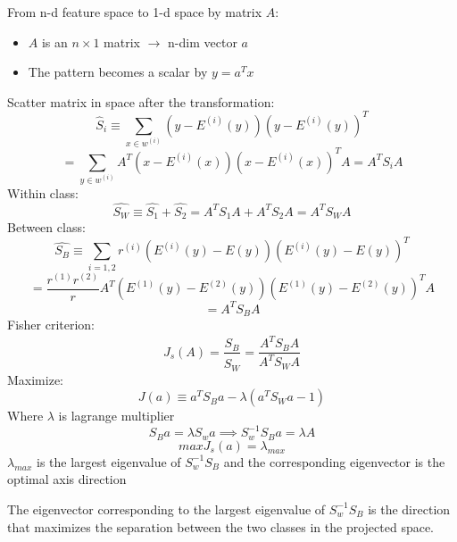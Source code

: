 \documentclass[12pt,a4paper]{article}
\begin{document}
From n-d feature space to 1-d space by matrix $A$:
\begin{itemize}
    \item $A$ is an $n \times 1$ matrix $\rightarrow$ n-dim vector $a$
    \item The pattern becomes a scalar by $y = a^T x$
\end{itemize}

Scatter matrix in space after the transformation:
\[
\hat{S}_i \equiv \sum_{x \in w^{(i)}} (y - E^{(i)}(y))(y - E^{(i)}(y))^T
\]
\[
= \sum_{y \in w^{(i)}} A^T (x - E^{(i)}(x))(x - E^{(i)}(x))^T A = A^T S_i A
\]
Within class:
\[
\hat{S_W} \equiv \hat{S_1} + \hat{S_2} = A^T S_1 A + A^T S_2 A = A^T S_W A
\]
Between class:
\[
\hat{S_B} \equiv \sum_{i=1,2} r^{(i)} (E^{(i)}(y) - E(y))(E^{(i)}(y) - E(y))^T
\]
\[
= \frac{r^{(1)}r^{(2)}}{r} A^T (E^{(1)}(y) - E^{(2)}(y))(E^{(1)}(y) - E^{(2)}(y))^TA
\]
\[
= A^T S_B A
\]
Fisher criterion:
\[
J_s(A) = \frac{\hat{S_B}}{\hat{S_W}} = \frac{A^T S_B A}{A^T S_W A}
\]
Maximize:
\[
J(a) \equiv a^T S_B a - \lambda (a^T S_W a - 1)
\]
Where $\lambda$ is lagrange multiplier
\[
S_B a = \lambda S_w a \implies S_{w}^{-1} S_B a = \lambda A
\]
\[
max{J_s(a)} = \lambda_{max}
\]
$\lambda_{max}$ is the largest eigenvalue of $S_w^{-1} S_B$ and the corresponding eigenvector is the optimal axis direction
\newline
\vspace{10pt}

The eigenvector corresponding to the largest eigenvalue of $S_w^{-1} S_B$ is the direction that maximizes the separation between the two classes in the projected space.
\end{document}
